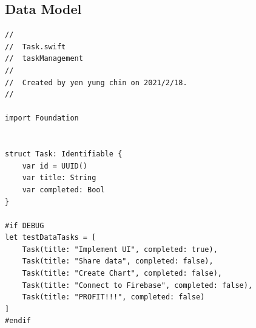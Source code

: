 \documentclass[a4paper,12pt]{article}
\begin{document}
\subsection{Data Model}
\label{sec:orgc259d2c}
\lstset{breaklines=true,language=swift,label= ,caption= ,captionpos=b,numbers=none}
\begin{lstlisting}
//
//  Task.swift
//  taskManagement
//
//  Created by yen yung chin on 2021/2/18.
//

import Foundation


struct Task: Identifiable {
    var id = UUID()
    var title: String
    var completed: Bool
}

#if DEBUG
let testDataTasks = [
    Task(title: "Implement UI", completed: true),
    Task(title: "Share data", completed: false),
    Task(title: "Create Chart", completed: false),
    Task(title: "Connect to Firebase", completed: false),
    Task(title: "PROFIT!!!", completed: false)
]
#endif
\end{lstlisting}
\end{document}
